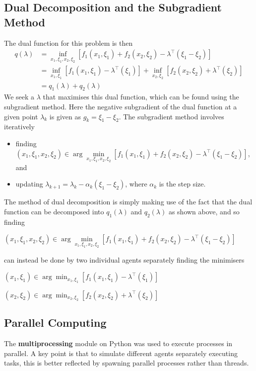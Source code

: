 \documentclass[12pt]{article}
\begin{document}
\subsection*{Dual Decomposition and the Subgradient Method}
The dual function for this problem is then
\begin{align*}
q(\lambda)&=\inf_{x_1,\xi_1,x_2,\xi_2}[f_1(x_1,\xi_1)+f_2(x_2,\xi_2)-\lambda^\top(\xi_1-\xi_2)]\\
&=\inf_{x_1,\xi_1}[f_1(x_1,\xi_1)-\lambda^\top(\xi_1)]+\inf_{x_2,\xi_2}[f_2(x_2,\xi_2)+\lambda^\top(\xi_2)]\\
&=q_1(\lambda)+q_2(\lambda)
\end{align*}
We seek a $\lambda$ that maximises this dual function, which can be found using the subgradient method. Here the negative subgradient of the dual function at a given point $\lambda_k$ is given as $g_k=\xi_1-\xi_2$. The subgradient method involves iteratively
\begin{itemize}
	\item finding $(x_1,\xi_1,x_2,\xi_2)\in\arg\min\limits_{x_1,\xi_1,x_2,\xi_2}[f_1(x_1,\xi_1)+f_2(x_2,\xi_2)-\lambda^\top(\xi_1-\xi_2)]$, and
	\item updating $\lambda_{k+1}=\lambda_k-\alpha_k(\xi_1-\xi_2)$, where $\alpha_k$ is the step size.
\end{itemize}

The method of dual decomposition is simply making use of the fact that the dual function can be decomposed into $q_1(\lambda)$ and $q_2(\lambda)$ as shown above, and so finding

$(x_1,\xi_1,x_2,\xi_2)\in\arg\min\limits_{x_1,\xi_1,x_2,\xi_2}[f_1(x_1,\xi_1)+f_2(x_2,\xi_2)-\lambda^\top(\xi_1-\xi_2)]$

\noindent can instead be done by two individual agents separately finding the minimisers

$(x_1,\xi_1)\in\arg\min_{x_1,\xi_1}[f_1(x_1,\xi_1)-\lambda^\top(\xi_1)]$

$(x_2,\xi_2)\in\arg\min_{x_2,\xi_2}[f_2(x_2,\xi_2)+\lambda^\top(\xi_2)]$

\subsection*{Parallel Computing}

The \textbf{multiprocessing} module on Python was used to execute processes in parallel. A key point is that to simulate different agents separately executing tasks, this is better reflected by spawning parallel processes rather than threads.
\end{document}

